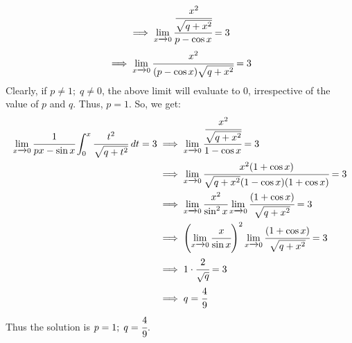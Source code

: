 \documentclass{article}
\begin{document}
$$\implies \lim_{x \xrightarrow{} 0} \cfrac{\cfrac{x^2}{\sqrt{q+x^2}}}{p-\cos x}  = 3$$
$$\implies \lim_{x \xrightarrow{} 0} \cfrac{x^2}{(p-\cos x)\sqrt{q+x^2}}  = 3$$
Clearly, if $p \neq 1; \; q \neq 0$, the above limit will evaluate to 0, irrespective of the value of $p$ and $q$. Thus, $p = 1$. So, we get:
\begin{align*}
  \lim_{x \xrightarrow{} 0} \cfrac{1}{px-\sin x} \int_{0}^{x} \cfrac{t^2}{\sqrt{q+t^2}}\; dt = 3 
  &\implies  \lim_{x \xrightarrow{} 0} \cfrac{\cfrac{x^2}{\sqrt{q+x^2}}}{1-\cos x} = 3 \\
  &\implies  \lim_{x \xrightarrow{} 0} \cfrac{x^2 (1 + \cos x)}{\sqrt{q+x^2}(1-\cos x)(1+\cos x)} = 3 \\
  &\implies  \lim_{x \xrightarrow{} 0} \cfrac{x^2 }{\sin ^2 x} \lim_{x \xrightarrow{} 0} \cfrac{(1 + \cos x)}{\sqrt{q+x^2}} = 3 \\
  &\implies  \left(\lim_{x \xrightarrow{} 0} \cfrac{x}{\sin x} \right)^2 \lim_{x \xrightarrow{} 0} \cfrac{(1 + \cos x)}{\sqrt{q+x^2}} = 3 \\
  &\implies 1 \cdot \cfrac{2}{\sqrt{q}} = 3 \\
  &\implies q = \cfrac{4}{9} \\
\end{align*}
Thus the solution is $p = 1; \; q =   \cfrac{4}{9}$.
\newpage
\end{document}
